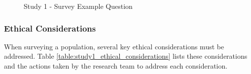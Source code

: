 \documentclass[manuscript,screen,review]{acmart}
\begin{document}
\begin{figure}
    \caption{Study 1 - Survey Example Question}
  \label{fig:example_survey_question}
\end{figure}

\subsubsection{Ethical Considerations} 
\label{study1_ethics}

When surveying a population, several key ethical considerations must be addressed. Table \ref{table:study1_ethical_considerations} lists these considerations and the actions taken by the research team to address each consideration.
\end{document}
